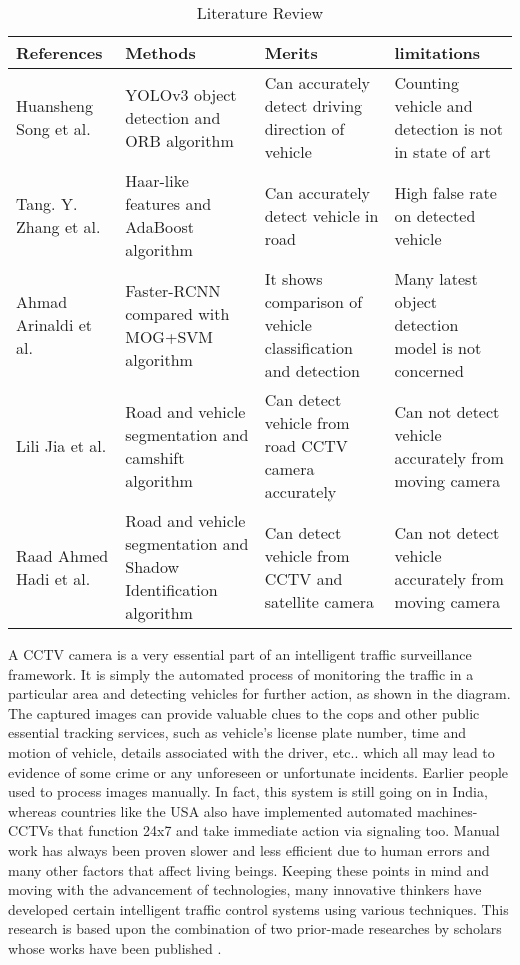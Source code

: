 \begin{table}[!h]
  \centering
  \caption[Literature Review]{Literature Review}
  \label{tab:lit_review}
  {\renewcommand{\arraystretch}{1.1}
\begin{tabular}{p{2cm} p{3cm} p{3cm} p{3cm}} 
   \toprule
  References & Methods & Merits & limitations \\
  \hline
  Huansheng Song et al.\cite{SongH2019} & YOLOv3 object detection and ORB algorithm
 & Can accurately detect driving direction of vehicle
 & Counting vehicle and detection is not in state of art
 \\ 
  \hline
  Tang. Y. Zhang et al.\cite{TangYong} & Haar-like features and AdaBoost algorithm
 & Can accurately detect
vehicle in road
 & High false rate on detected vehicle  \\ 
  \hline
  Ahmad Arinaldi et al.\cite{ARINALDI2018259} & Faster-RCNN compared with MOG+SVM algorithm
 & It shows comparison of vehicle classification and detection
 & Many latest object detection model is not concerned
 \\ 
  \hline
  Lili Jia et al.\cite{lilijia} & Road and vehicle segmentation and camshift algorithm
 & Can detect vehicle from road CCTV camera accurately
 & Can not detect vehicle accurately from moving camera
 \\ 
  \hline
  Raad Ahmed Hadi et al.\cite{10.1007/978-3-642-31968-6_70} & Road and vehicle segmentation and Shadow Identification algorithm
 & Can detect vehicle from CCTV and satellite camera
 & Can not detect vehicle accurately from moving camera
  \\
  \bottomrule
\end{tabular}
  }
\end{table}


A CCTV camera is a very essential part of an intelligent traffic surveillance framework. It is simply the automated process of monitoring the traffic in a particular area and detecting vehicles for further action, as shown in the diagram. The captured images can provide valuable clues to the cops and other public essential tracking services, such as vehicle’s license plate number, time and motion of vehicle, details associated with the driver, etc.. which all may lead to evidence of some crime or any unforeseen or unfortunate incidents. Earlier people used to process images manually. In fact, this system is still going on in India, whereas countries like the USA also have implemented automated machines- CCTVs that function 24x7 and take immediate action via signaling too. Manual work has always been proven slower and less efficient due to human errors and many other factors that affect living beings. Keeping these points in mind and moving with the advancement of technologies, many innovative thinkers have developed certain intelligent traffic control systems using various techniques. This research is based upon the combination of two prior-made researches by scholars whose works have been published \cite{Baran2016}.
